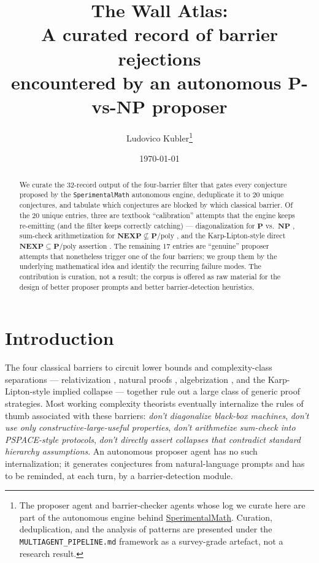 \documentclass[11pt,a4paper]{article}
\title{The Wall Atlas:\\
A curated record of barrier rejections\\
encountered by an autonomous P-vs-NP proposer}
\author{Ludovico Kubler\thanks{The proposer agent and barrier-checker
agents whose log we curate here are part of the autonomous engine
behind \href{https://github.com/ludwigkubler/SperimentalMath}{SperimentalMath}.
Curation, deduplication, and the analysis of patterns are presented
under the \texttt{MULTIAGENT\_PIPELINE.md} framework as a survey-grade
artefact, not a research result.}}
\date{\today}
\begin{document}
\maketitle

\begin{abstract}
We curate the $32$-record output of the four-barrier filter that gates
every conjecture proposed by the \texttt{SperimentalMath} autonomous
engine, deduplicate it to $20$ unique conjectures, and tabulate which
conjectures are blocked by which classical barrier. Of the $20$
unique entries, three are textbook ``calibration'' attempts that the
engine keeps re-emitting (and the filter keeps correctly catching) —
diagonalization for $\mathbf{P}$ vs.\ $\mathbf{NP}$
\cite{BakerGillSolovay1975}, sum-check arithmetization for
$\mathbf{NEXP} \not\subseteq \mathbf{P}/\mathrm{poly}$
\cite{AaronsonWigderson2008}, and the Karp-Lipton-style direct
$\mathbf{NEXP} \subseteq \mathbf{P}/\mathrm{poly}$ assertion
\cite{KarpLipton1980}. The remaining $17$ entries are ``genuine''
proposer attempts that nonetheless trigger one of the four barriers; we
group them by the underlying mathematical idea and identify the
recurring failure modes. The contribution is curation, not a result; the
corpus is offered as raw material for the design of better proposer
prompts and better barrier-detection heuristics.
\end{abstract}

\section{Introduction}\label{sec:intro}

The four classical barriers to circuit lower bounds and complexity-class
separations — relativization \cite{BakerGillSolovay1975}, natural
proofs \cite{RazborovRudich1997}, algebrization
\cite{AaronsonWigderson2008}, and the Karp-Lipton-style implied collapse
\cite{KarpLipton1980} — together rule out a large class of generic proof
strategies. Most working complexity theorists eventually internalize
the rules of thumb associated with these barriers: \emph{don't
diagonalize black-box machines}, \emph{don't use only
constructive-large-useful properties}, \emph{don't arithmetize sum-check
into PSPACE-style protocols}, \emph{don't directly assert collapses
that contradict standard hierarchy assumptions}. An autonomous
proposer agent has no such internalization; it generates conjectures
from natural-language prompts and has to be reminded, at each turn, by
a barrier-detection module.
\end{document}
